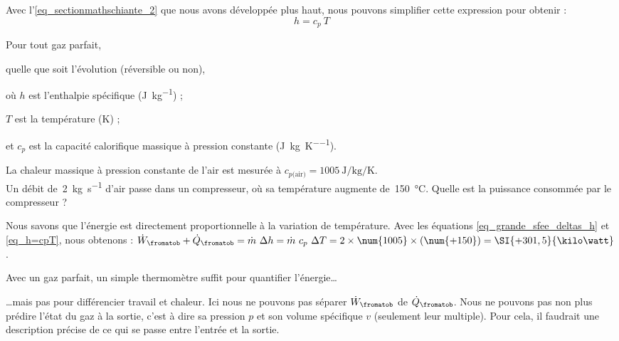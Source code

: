 		Avec l’\cref{eq_sectionmathschiante_2} que nous avons développée plus haut, nous pouvons simplifier cette expression pour obtenir :
			\begin{equation}
				h = c_p \ T
				\label{eq_h=cpT}
			\end{equation}
			\begin{equationterms}
				\item Pour tout gaz parfait,
				\item quelle que soit l’évolution (réversible ou non),
				\item où \tab $h$ 	\tab est l’enthalpie spécifique (\si{\joule\per\kilogram}) ;
				\item 	\tab $T$ 	\tab est la température (\si{\kelvin}) ;
				\item et \tab $c_p$ 	\tab est la capacité calorifique massique à pression constante (\si{\joule\per\kilogram\per\kelvin}).
			\end{equationterms}
		
		
		\begin{anexample}
			La chaleur massique à pression constante de l’air est mesurée à $c_{p\text{(air)}} = \SI{1005}{\joule\per\kilogram\per\kelvin}$.\\
			Un débit de~\SI{2}{\kilogram\per\second} d’air passe dans un compresseur, où sa température augmente de~\SI{150}{\degreeCelsius}. Quelle est la puissance consommée par le compresseur ?
				\begin{answer}
					Nous savons que l’énergie est directement proportionnelle à la variation de température. Avec les équations \ref{eq_grande_sfee_deltas_h} et \ref{eq_h=cpT}, nous obtenons : $\dot W_\fromatob + \dot Q_\fromatob = \dot m \ \Delta h = \dot m \ c_p \ \Delta T = 2 \times \num{1005} \times (\num{+150}) = \SI{+301,5}{\kilo\watt}$.
				\end{answer}
					\begin{remark}Avec un gaz parfait, un simple thermomètre suffit pour quantifier l’énergie…\end{remark}
					\begin{remark}…mais pas pour différencier travail et chaleur. Ici nous ne pouvons pas séparer $\dot W_\fromatob$ de $\dot Q_\fromatob$. Nous ne pouvons pas non plus prédire l’état du gaz à la sortie, c’est à dire sa pression $p$ et son volume spécifique $v$ (seulement leur multiple). Pour cela, il faudrait une description précise de ce qui se passe entre l’entrée et la sortie.\end{remark}
		\end{anexample}


